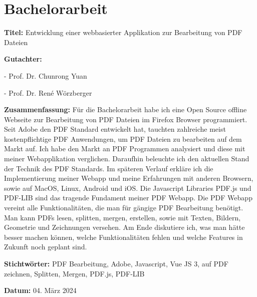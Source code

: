 \chapter*{Bachelorarbeit}
\label{chap:abstract}
%
\textbf{Titel:} Entwicklung einer webbasierter Applikation zur Bearbeitung von PDF\\ Dateien

\textbf{Gutachter:}
\par
- Prof. Dr. Chunrong Yuan
\par
- Prof. Dr. René Wörzberger

\textbf{Zusammenfassung:} Für die Bachelorarbeit habe ich eine Open Source offline Webseite zur Bearbeitung von PDF Dateien im Firefox Browser programmiert. Seit Adobe den PDF Standard entwickelt hat, tauchten zahlreiche meist kostenpflichtige PDF Anwendungen, um PDF Dateien zu bearbeiten auf dem Markt auf. Ich habe den Markt an PDF Programmen analysiert und diese mit meiner Webapplikation verglichen. Daraufhin beleuchte ich den aktuellen Stand der Technik des PDF Standards. Im späteren Verlauf erkläre ich die Implementierung meiner Webapp und meine Erfahrungen mit anderen Browsern, sowie auf MacOS, Linux, Android und iOS. Die Javascript Libraries PDF.js und PDF-LIB sind das tragende Fundament meiner PDF Webapp. Die PDF Webapp vereint alle Funktionalitäten, die man für gängige PDF Bearbeitung benötigt. Man kann PDFs lesen, splitten, mergen, erstellen, sowie mit Texten, Bildern, Geometrie und Zeichnungen versehen. Am Ende diskutiere ich, was man hätte besser machen können, welche Funktionalitäten fehlen und welche Features in Zukunft noch geplant sind.

\textbf{Stichtwörter:} PDF Bearbeitung, Adobe, Javascript, Vue JS 3, auf PDF zeichnen, Splitten, Mergen, PDF.js, PDF-LIB

\textbf{Datum:} 04. März 2024
